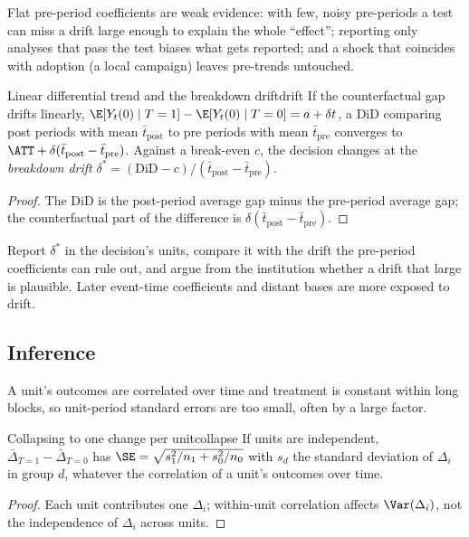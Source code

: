 \documentclass[11pt]{article}
\begin{document}
Flat pre-period coefficients are weak evidence: with few, noisy pre-periods a test can miss a drift large enough to explain the whole
``effect''; reporting only analyses that pass the test biases what gets reported; and a shock that coincides with adoption (a local campaign)
leaves pre-trends untouched.

\begin{prop}{Linear differential trend and the breakdown drift}{drift}
If the counterfactual gap drifts linearly, $\E[Y_t(0) \mid T=1] - \E[Y_t(0) \mid T=0] = a + \delta t$, a DiD comparing post periods with mean
$\bar t_{\text{post}}$ to pre periods with mean $\bar t_{\text{pre}}$ converges to $\ATT + \delta(\bar t_{\text{post}} - \bar t_{\text{pre}})$. Against a break-even $c$,
the decision changes at the \emph{breakdown drift} $\delta^\ast = (\text{DiD} - c)/(\bar t_{\text{post}} - \bar t_{\text{pre}})$.
\end{prop}
\begin{proof}
The DiD is the post-period average gap minus the pre-period average gap; the counterfactual part of the difference is
$\delta(\bar t_{\text{post}} - \bar t_{\text{pre}})$.
\end{proof}

Report $\delta^\ast$ in the decision's units, compare it with the drift the pre-period coefficients can rule out, and argue from the institution
whether a drift that large is plausible. Later event-time coefficients and distant bases are more exposed to drift.

\subsection{Inference}

A unit's outcomes are correlated over time and treatment is constant within long blocks, so unit-period standard errors are too small, often
by a large factor.

\begin{prop}{Collapsing to one change per unit}{collapse}
If units are independent, $\bar\Delta_{T=1} - \bar\Delta_{T=0}$ has $\SE = \sqrt{s_1^2/n_1 + s_0^2/n_0}$ with $s_d$ the standard deviation of $\Delta_i$ in
group $d$, whatever the correlation of a unit's outcomes over time.
\end{prop}
\begin{proof}
Each unit contributes one $\Delta_i$; within-unit correlation affects $\Var(\Delta_i)$, not the independence of $\Delta_i$ across units.
\end{proof}
\end{document}
